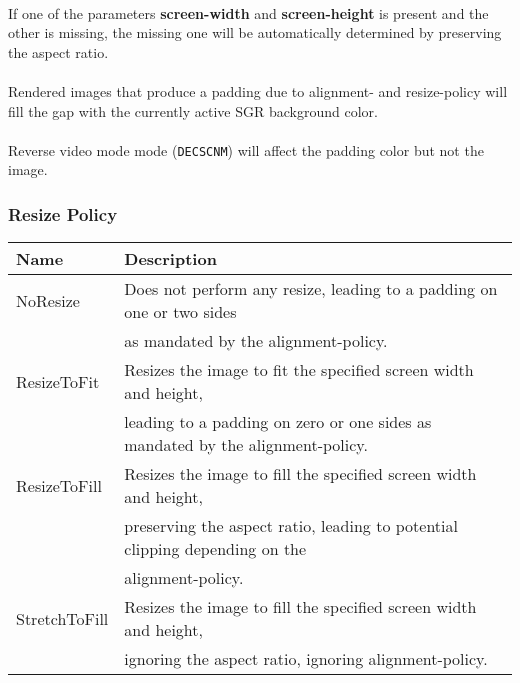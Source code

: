 \documentclass[a4paper]{article}
\newcommand{\code}[1]{\colorbox{light-gray}{\texttt{#1}}}
\begin{document}

\paragraph*{}
If one of the parameters \textbf{screen-width} and \textbf{screen-height} is present and the other is
missing, the missing one will be automatically determined by preserving the aspect ratio.

\paragraph*{}
Rendered images that produce a padding due to alignment- and resize-policy will fill the gap with the
currently active SGR background color.

\paragraph*{}
Reverse video mode mode (\code{DECSCNM}) will affect the padding color but not the image.

\subsubsection*{Resize Policy}

\begin{tabular}{ |l|l| }
    \hline
    \textbf{Name}          & \textbf{Description} \\
    \hline
    NoResize      & Does not perform any resize, leading to a padding on one or two sides \\
                  & as mandated by the alignment-policy. \\
    ResizeToFit   & Resizes the image to fit the specified screen width and height, \\
                  & leading to a padding on zero or one sides as mandated by the alignment-policy. \\
    ResizeToFill  & Resizes the image to fill the specified screen width and height, \\
                  & preserving the aspect ratio, leading to potential clipping depending on the \\
                  & alignment-policy. \\
    StretchToFill & Resizes the image to fill the specified screen width and height, \\
                  & ignoring the aspect ratio, ignoring alignment-policy. \\
    \hline
\end{tabular}
\end{document}
